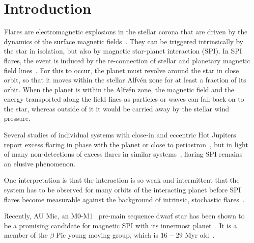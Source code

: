 \documentclass[fleqn,usenatbib]{mnras}%
\begin{document}
\section{Introduction}

Flares are electromagnetic explosions in the stellar corona that are driven by the dynamics of the surface magnetic fields~\citep{benz2010}. They can be triggered intrinsically by the star in isolation, but also by magnetic star-planet interaction (SPI). In SPI flares, the event is induced by the re-connection of stellar and planetary magnetic field lines~\citep{saur2013magnetic,lanza2018close-by,fischer2019}. For this to occur, the planet must revolve around the star in close orbit, so that it moves within the stellar Alfv\'en zone for at least a fraction of its orbit. When the planet is within the Alfv\'en zone, the magnetic field and the energy transported along the field lines as particles or waves can fall back on to the star, whereas outside of it it would be carried away by the stellar wind pressure. 



Several studies of individual systems with close-in and eccentric Hot Jupiters report excess flaring in phase with the planet or close to periastron~\citep{shkolnik2005,pillitteri2011,maggio2015}, but in light of many non-detections of excess flares in similar systems~\citep{figueira2016, fischer2019}, flaring SPI remains an elusive phenomenon. 

One interpretation is that the interaction is so weak and intermittent that the system has to be observed for many orbits of the interacting planet before SPI flares become measurable against the background of intrinsic, stochastic flares~\citep{shkolnik2008,lanza2009, saur2013magnetic,strugarek2015}.

Recently, AU Mic, an M0-M1~\citep{pecaut2013,gaidos2014} pre-main sequence dwarf star has been shown to be a promising candidate for magnetic SPI with its innermost planet~\citep{kavanagh2021}. It is a member of the $\beta$ Pic young moving group, which is $16-29$ Myr old~\citep{malo2014,binks2014,mamajek2014,bell2015,binks2016,shkolnik2017,miretroig2020}. %
\end{document}
